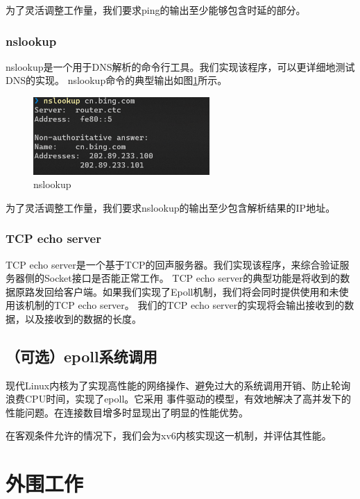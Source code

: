 \documentclass[a4paper,twoside]{article}
\begin{document}
\begin{spacing}{1.2}
为了灵活调整工作量，我们要求ping的输出至少能够包含时延的部分。


\subsubsection{nslookup}

nslookup是一个用于DNS解析的命令行工具。我们实现该程序，可以更详细地测试DNS的实现。
nslookup命令的典型输出如图\ref{fig:nslookup}所示。

\begin{figure}[htb]
	\centering
	\caption{nslookup}
	\label{fig:nslookup}
	\includegraphics[width=0.6\textwidth]{nslookup.png}
\end{figure}

为了灵活调整工作量，我们要求nslookup的输出至少包含解析结果的IP地址。


\subsubsection{TCP echo server}

TCP echo server是一个基于TCP的回声服务器。我们实现该程序，来综合验证服务器侧的Socket接口是否能正常工作。
TCP echo server的典型功能是将收到的数据原路发回给客户端。如果我们实现了Epoll机制，我们将会同时提供使用和未使用该机制的TCP echo server。
我们的TCP echo server的实现将会输出接收到的数据，以及接收到的数据的长度。

\subsection{（可选）epoll系统调用}

现代Linux内核为了实现高性能的网络操作、避免过大的系统调用开销、防止轮询浪费CPU时间，实现了epoll。它采用
事件驱动的模型，有效地解决了高并发下的性能问题。在连接数目增多时显现出了明显的性能优势。

在客观条件允许的情况下，我们会为xv6内核实现这一机制，并评估其性能。


\section{外围工作}


\end{spacing}
\end{document}
